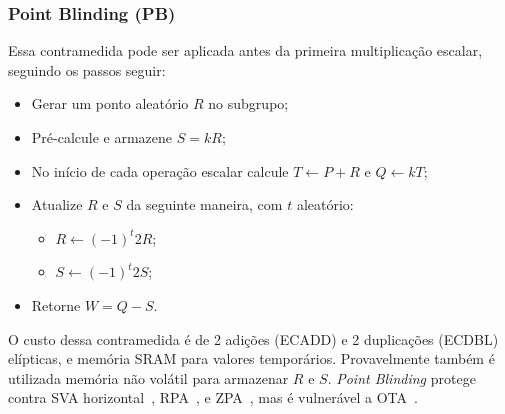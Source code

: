 \documentclass{SBCbookchapter}
\newcommand{\rcv}{\leftarrow}
\begin{document}
\subsubsection{Point Blinding (PB)~\cite{Coron1999}}
Essa contramedida pode ser aplicada antes da primeira multiplicação escalar, seguindo os passos seguir: 
\begin{itemize}
    \item Gerar um ponto aleatório $R$ no subgrupo;
    \item Pré-calcule e armazene $S = kR$;
    \item No início de cada operação escalar calcule $T \rcv P + R$ e $Q \rcv kT$;
    \item Atualize $R$ e $S$ da seguinte maneira, com $t$ aleatório:
    \begin{itemize}
        \item $R \rcv (-1)^t 2R$;
        \item $S \rcv (-1)^t 2S$;
    \end{itemize}
    \item Retorne $W = Q - S$.
\end{itemize}

O custo dessa contramedida é de 2 adições (ECADD) e 2 duplicações (ECDBL) elípticas, e  memória SRAM para valores temporários. Provavelmente também é utilizada memória não volátil para armazenar $R$ e $S$. \textit{Point Blinding} protege contra SVA horizontal~\cite{MurdicaGuilley2012}, RPA~\cite{Goubin2003}, e ZPA~\cite{AkishitaTakagi2003}, mas é vulnerável a OTA~\cite{BatinaChmielewski2014}.

\end{document}
